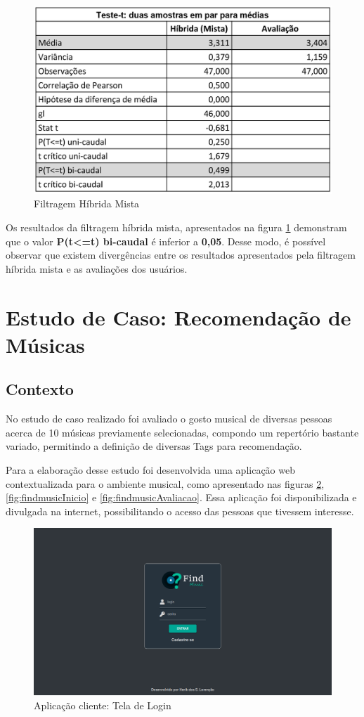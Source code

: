 \begin{figure}[H]
	\centering
	\includegraphics[width=.7\linewidth]{imagens/testeTMisto.jpg}
	\caption[Teste T: Filtragem Híbrida Mista]{Filtragem Híbrida Mista}
    \label{fig:testeTMisto}
\end{figure}

Os resultados da filtragem híbrida mista, apresentados na figura \ref{fig:testeTMisto} demonstram que o valor \textbf{P(t<=t) bi-caudal} é inferior a \textbf{0,05}. Desse modo, é possível observar que existem divergências entre os resultados apresentados pela filtragem híbrida mista e as avaliações dos usuários.

\section{Estudo de Caso: Recomendação de Músicas}

\subsection{Contexto}

No estudo de caso realizado foi avaliado o gosto musical de diversas pessoas acerca de 10 músicas previamente selecionadas, compondo um repertório bastante variado, permitindo a definição de diversas Tags para recomendação.

Para a elaboração desse estudo foi desenvolvida uma aplicação web contextualizada para o ambiente musical, como apresentado nas figuras \ref{fig:findmusicLogin}, \ref{fig:findmusicInicio} e \ref{fig:findmusicAvaliacao}. Essa aplicação foi disponibilizada e divulgada na internet, possibilitando o acesso das pessoas que tivessem interesse.

\begin{figure}[H]
	\centering
	\includegraphics[width=.7\linewidth]{imagens/findmusicLogin.png}
	\caption[Aplicação cliente: Tela de Login]{Aplicação cliente: Tela de Login}
    \label{fig:findmusicLogin}
\end{figure}

